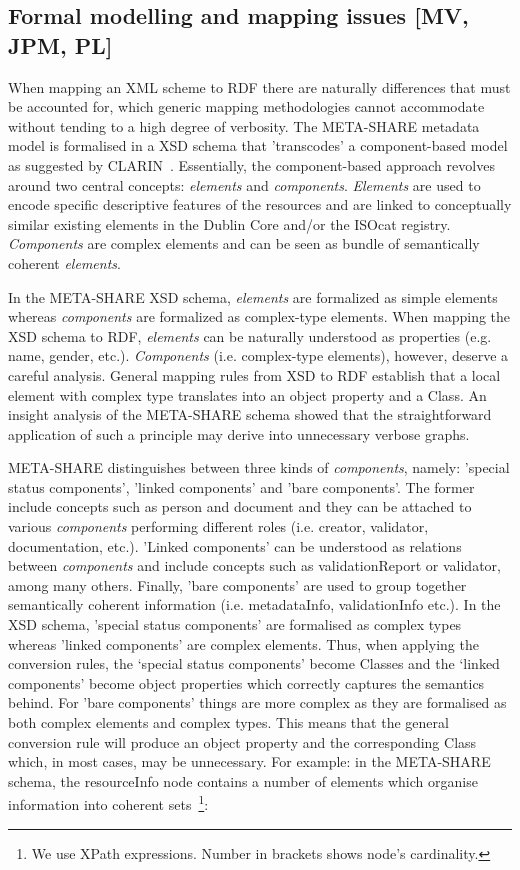 \documentclass{llncs}
\begin{document}
\subsection{Formal modelling and mapping issues [MV, JPM, PL]}

When mapping an XML scheme to RDF there are naturally differences that must be
accounted for, which generic mapping methodologies cannot accommodate without
tending to a high degree of verbosity. 
The META-SHARE metadata model is formalised in a XSD schema that 'transcodes' a component-based model as suggested by CLARIN~\cite{broeder2012cmdi}. Essentially, the component-based approach revolves around two central concepts: \emph{elements} and \emph{components}. \emph{Elements} are used to encode specific descriptive features of the resources and are linked to conceptually similar existing elements in the Dublin Core and/or the ISOcat registry. \emph{Components} are complex elements and can be seen as bundle of semantically coherent \emph{elements}.

In the META-SHARE XSD schema, \emph{elements} are formalized as simple elements whereas \emph{components} are formalized as complex-type elements. When mapping the XSD schema to RDF, \emph{elements} can be naturally understood as properties (e.g. name, gender, etc.). \emph{Components} (i.e. complex-type elements), however,  deserve a careful analysis. General mapping rules from XSD to RDF establish that a local element with complex type translates into an object property and a Class. An insight analysis of the META-SHARE schema showed that the straightforward application of such a principle may derive into unnecessary verbose graphs. 

META-SHARE distinguishes between three kinds of \emph{components}, namely: 'special status components', 'linked components' and 'bare components'. The former include concepts such as person and document and they can be attached to various \emph{components} performing different roles (i.e. creator, validator, documentation, etc.). 'Linked components' can be understood as relations between \emph{components} and include concepts such as validationReport or validator, among many others. Finally, 'bare components' are used to group together semantically coherent information (i.e. metadataInfo, validationInfo etc.). In the XSD schema, 'special status components' are formalised as complex types whereas 'linked components' are complex elements. Thus, when applying the conversion rules, the ‘special status components’ become Classes and the ‘linked components’ become object properties which correctly captures the semantics behind. For 'bare components' things are more complex as they are formalised as both complex elements and complex types. This means that the general conversion rule will produce an object property and the corresponding Class which, in most cases, may be unnecessary. For example: in the META-SHARE schema, the resourceInfo node contains a number of elements which organise information into coherent sets~\footnote{We use XPath expressions. Number in brackets shows node’s cardinality.}: 
\end{document}
